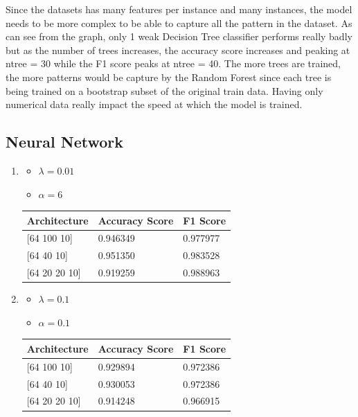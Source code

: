 \documentclass[letterpaper]{article}
\begin{document}
Since the datasets has many features per instance and many instances, the model needs to be more complex to be able to capture all the pattern
in the dataset. As can see from the graph, only 1 weak Decision Tree classifier performs really badly but as the number of trees increases, the accuracy
score increases and peaking at ntree = 30 while the F1 score peaks at ntree = 40. The more trees are trained, the more patterns would be capture by
the Random Forest since each tree is being trained on a bootstrap subset of the original train data. Having only numerical data really impact the
speed at which the model is trained.

\subsection*{Neural Network}
\begin{enumerate}[label=(\alph*)]
	\item \begin{itemize}
		      \item $\lambda = 0.01$
		      \item $\alpha = 6$
	      \end{itemize}

	      \begin{table}[H]
		      \centering
		      \begin{tabular}{|l|l|l|}
			      \hline
			      Architecture      & Accuracy Score & F1 Score \\ \hline
			      {[}64 100 10{]}   & 0.946349       & 0.977977 \\ \hline
			      {[}64 40 10{]}    & 0.951350       & 0.983528 \\ \hline
			      {[}64 20 20 10{]} & 0.919259       & 0.988963 \\ \hline
		      \end{tabular}
	      \end{table}
	\item \begin{itemize}
		      \item $\lambda = 0.1$
		      \item $\alpha = 0.1$
	      \end{itemize}

	      \begin{table}[H]
		      \centering
		      \begin{tabular}{|l|l|l|}
			      \hline
			      Architecture      & Accuracy Score & F1 Score \\ \hline
			      {[}64 100 10{]}   & 0.929894       & 0.972386 \\ \hline
			      {[}64 40 10{]}    & 0.930053       & 0.972386 \\ \hline
			      {[}64 20 20 10{]} & 0.914248       & 0.966915 \\ \hline
		      \end{tabular}
	      \end{table}
\end{enumerate}
\end{document}
